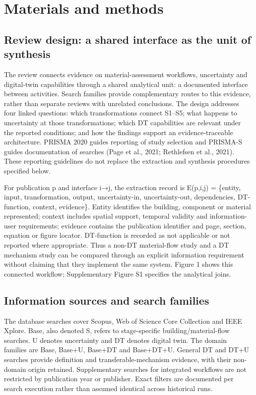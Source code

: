 \section{Materials and methods}

\subsection{Review design: a shared interface as the unit of synthesis}
The review connects evidence on material-assessment workflows, uncertainty and digital-twin capabilities through a shared analytical unit: a documented interface between activities. Search families provide complementary routes to this evidence, rather than separate reviews with unrelated conclusions. The design addresses four linked questions: which transformations connect S1–S5; what happens to uncertainty at those transformations; which DT capabilities are relevant under the reported conditions; and how the findings support an evidence-traceable architecture. PRISMA 2020 guides reporting of study selection and PRISMA-S guides documentation of searches (Page et al., 2021; Rethlefsen et al., 2021). These reporting guidelines do not replace the extraction and synthesis procedures specified below.

For publication p and interface i→j, the extraction record is E(p,i,j) = \{entity, input, transformation, output, uncertainty-in, uncertainty-out, dependencies, DT-function, context, evidence\}. Entity identifies the building, component or material represented; context includes spatial support, temporal validity and information-user requirements; evidence contains the publication identifier and page, section, equation or figure locator. DT-function is recorded as not applicable or not reported where appropriate. Thus a non-DT material-flow study and a DT mechanism study can be compared through an explicit information requirement without claiming that they implement the same system. Figure 1 shows this connected workflow; Supplementary Figure S1 specifies the analytical joins.


\subsection{Information sources and search families}
The database searches cover Scopus, Web of Science Core Collection and IEEE Xplore. Base, also denoted S, refers to stage-specific building/material-flow searches. U denotes uncertainty and DT denotes digital twin. The domain families are Base, Base+U, Base+DT and Base+DT+U. General DT and DT+U searches provide definition and transferable-mechanism evidence, with their non-domain origin retained. Supplementary searches for integrated workflows are not restricted by publication year or publisher. Exact filters are documented per search execution rather than assumed identical across historical runs.

